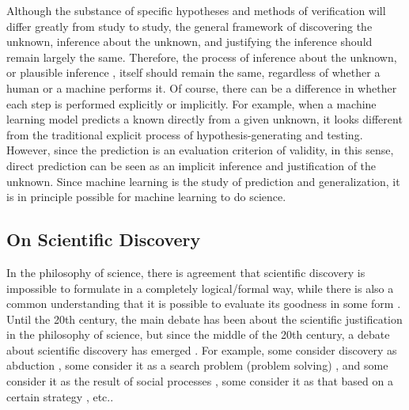 \documentclass{article}
\begin{document}
Although the substance of specific hypotheses and methods of verification will differ greatly from study to study, the general framework of discovering the unknown, inference about the unknown, and justifying the inference should remain largely the same. Therefore, the process of inference about the unknown, or plausible inference \cite{polya1954mathematics}, itself should remain the same, regardless of whether a human or a machine performs it. Of course, there can be a difference in whether each step is performed explicitly or implicitly. For example, when a machine learning model predicts a known directly from a given unknown, it looks different from the traditional explicit process of hypothesis-generating and testing. However, since the prediction is an evaluation criterion of validity, in this sense, direct prediction can be seen as an implicit inference and justification of the unknown. Since machine learning is the study of prediction and generalization, it is in principle possible for machine learning to do science.

\subsection{On Scientific Discovery}
In the philosophy of science, there is agreement that scientific discovery is impossible to formulate in a completely logical/formal way, while there is also a common understanding that it is possible to evaluate its goodness in some form \cite{nickles2014,scientificdiscovery}. Until the 20th century, the main debate has been about the scientific justification in the philosophy of science, but since the middle of the 20th century, a debate about scientific discovery has emerged \cite{scientificdiscovery}. For example, some consider discovery as abduction \cite{hanson1965patterns}, some consider it as a search problem (problem solving) \cite{simon1973does,simon1981scientific}, and some consider it as the result of social processes \cite{kuhn1970structure,lakatos1980methodology}, some consider it as that based on a certain strategy \cite{darden1991theory}, etc.\cite{scientificdiscovery}.
\end{document}
